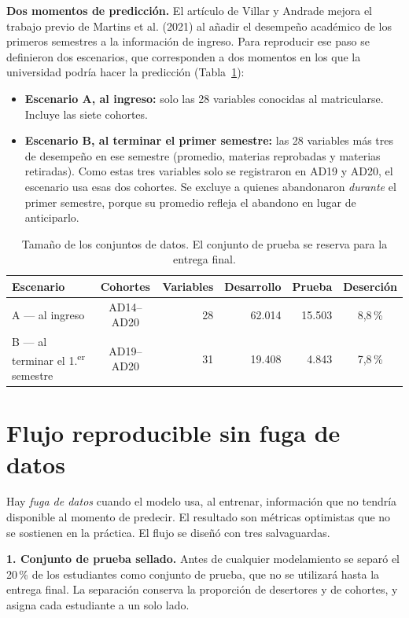 \documentclass[11pt,a4paper]{article}
\begin{document}
\textbf{Dos momentos de predicción.} El artículo de Villar y Andrade mejora el trabajo previo de Martins et al. (2021) al añadir el desempeño académico de los primeros semestres a la información de ingreso. Para reproducir ese paso se definieron dos escenarios, que corresponden a dos momentos en los que la universidad podría hacer la predicción (Tabla~\ref{tab:escenarios}):
\begin{itemize}[leftmargin=1.2em,itemsep=1pt,topsep=2pt]
\item \textbf{Escenario A, al ingreso:} solo las 28 variables conocidas al matricularse. Incluye las siete cohortes.
\item \textbf{Escenario B, al terminar el primer semestre:} las 28 variables más tres de desempeño en ese semestre (promedio, materias reprobadas y materias retiradas). Como estas tres variables solo se registraron en AD19 y AD20, el escenario usa esas dos cohortes. Se excluye a quienes abandonaron \emph{durante} el primer semestre, porque su promedio refleja el abandono en lugar de anticiparlo.
\end{itemize}

\begin{table}[H]
\centering
\small
\caption{Tamaño de los conjuntos de datos. El conjunto de prueba se reserva para la entrega final.}
\label{tab:escenarios}
\begin{tabular}{lcrrrc}
\toprule
Escenario & Cohortes & Variables & Desarrollo & Prueba & Deserción \\
\midrule
A --- al ingreso & AD14--AD20 & 28 & 62.014 & 15.503 & 8,8\,\% \\
B --- al terminar el 1.\textsuperscript{er} semestre & AD19--AD20 & 31 & 19.408 & 4.843 & 7,8\,\% \\
\bottomrule
\end{tabular}
\end{table}

\section{Flujo reproducible sin fuga de datos}

Hay \emph{fuga de datos} cuando el modelo usa, al entrenar, información que no tendría disponible al momento de predecir. El resultado son métricas optimistas que no se sostienen en la práctica. El flujo se diseñó con tres salvaguardas.

\textbf{1. Conjunto de prueba sellado.} Antes de cualquier modelamiento se separó el 20\,\% de los estudiantes como conjunto de prueba, que no se utilizará hasta la entrega final. La separación conserva la proporción de desertores y de cohortes, y asigna cada estudiante a un solo lado.
\end{document}
